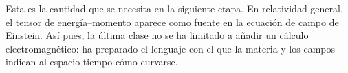 Esta es la cantidad que se necesita en la siguiente etapa. En relatividad general, el tensor de energía--momento aparece como fuente en la ecuación de campo de Einstein. Así pues, la última clase no se ha limitado a añadir un cálculo electromagnético: ha preparado el lenguaje con el que la materia y los campos indican al espacio-tiempo cómo curvarse.